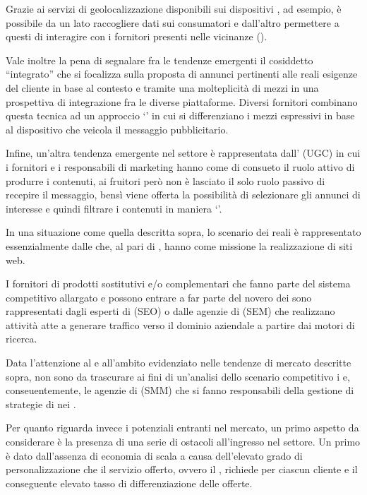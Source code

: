 Grazie ai servizi di geolocalizzazione disponibili sui dispositivi , ad esempio, è possibile da un lato raccogliere dati sui consumatori e dall'altro permettere a questi di interagire con i fornitori presenti nelle vicinanze ().

Vale inoltre la pena di segnalare fra le tendenze emergenti il cosiddetto ``\mktg integrato'' che si focalizza sulla proposta di annunci pertinenti alle reali esigenze del cliente in base al contesto e tramite una molteplicità di mezzi in una prospettiva di integrazione fra le diverse piattaforme. Diversi fornitori combinano questa tecnica ad un approccio `' in cui si differenziano i mezzi espressivi in base al dispositivo che veicola il messaggio pubblicitario.

Infine, un'altra tendenza emergente nel settore è rappresentata dall' (UGC) in cui i fornitori e i responsabili di marketing hanno come di consueto il ruolo attivo di produrre i contenuti,  ai fruitori però non è lasciato il solo ruolo passivo di recepire il messaggio, bensì viene offerta la possibilità di selezionare gli annunci di interesse e quindi filtrare i contenuti in maniera `'.

In una situazione come quella descritta sopra, lo scenario dei  reali è rappresentato essenzialmente dalle  che, al pari di \customer, hanno come missione la realizzazione di siti web.

I fornitori di prodotti sostitutivi e/o complementari che fanno parte del sistema competitivo allargato e possono entrare a far parte del novero dei  sono rappresentati dagli esperti di  (SEO) o dalle agenzie di  (SEM) che realizzano attività atte a generare traffico verso il dominio aziendale a partire dai motori di ricerca.

Data l'attenzione al  e all'ambito  evidenziato nelle tendenze di mercato descritte sopra, non sono da trascurare ai fini di un'analisi dello scenario competitivo i  e, conseuentemente, le agenzie di  (SMM) che si fanno responsabili della gestione di strategie di \mktg nei .

Per quanto riguarda invece i potenziali entranti nel mercato, un primo aspetto da considerare è la presenza di una serie di ostacoli all'ingresso nel settore. Un primo è dato dall'assenza di economia di scala a causa dell'elevato grado di personalizzazione che il servizio offerto, ovvero il \mktg {}, richiede per ciascun cliente e il conseguente elevato tasso di differenziazione delle offerte.

